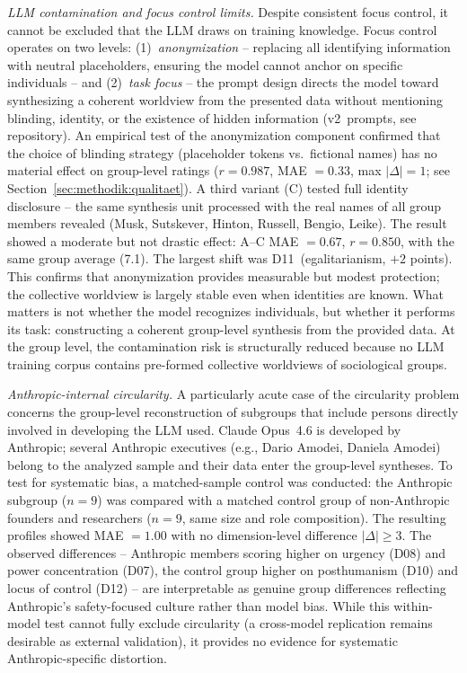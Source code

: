 \documentclass[12pt,a4paper]{article}
\begin{document}
\emph{LLM contamination and focus control limits.} Despite consistent focus control, it cannot be excluded that the LLM draws on training knowledge. Focus control operates on two levels: (1)~\emph{anonymization} -- replacing all identifying information with neutral placeholders, ensuring the model cannot anchor on specific individuals -- and (2)~\emph{task focus} -- the prompt design directs the model toward synthesizing a coherent worldview from the presented data without mentioning blinding, identity, or the existence of hidden information (v2~prompts, see repository). An empirical test of the anonymization component confirmed that the choice of blinding strategy (placeholder tokens vs.\ fictional names) has no material effect on group-level ratings ($r = 0.987$, MAE $= 0.33$, max $|\Delta| = 1$; see Section~\ref{sec:methodik:qualitaet}). A third variant (C) tested full identity disclosure -- the same synthesis unit processed with the real names of all group members revealed (Musk, Sutskever, Hinton, Russell, Bengio, Leike). The result showed a moderate but not drastic effect: A--C MAE $= 0.67$, $r = 0.850$, with the same group average (7.1). The largest shift was D11~(egalitarianism, $+2$ points). This confirms that anonymization provides measurable but modest protection; the collective worldview is largely stable even when identities are known. What matters is not whether the model recognizes individuals, but whether it performs its task: constructing a coherent group-level synthesis from the provided data. At the group level, the contamination risk is structurally reduced because no LLM training corpus contains pre-formed collective worldviews of sociological groups.

\emph{Anthropic-internal circularity.} A particularly acute case of the circularity problem concerns the group-level reconstruction of subgroups that include persons directly involved in developing the LLM used. Claude Opus~4.6 is developed by Anthropic; several Anthropic executives (e.g., Dario Amodei, Daniela Amodei) belong to the analyzed sample and their data enter the group-level syntheses. To test for systematic bias, a matched-sample control was conducted: the Anthropic subgroup ($n = 9$) was compared with a matched control group of non-Anthropic founders and researchers ($n = 9$, same size and role composition). The resulting profiles showed MAE $= 1.00$ with no dimension-level difference $|\Delta| \geq 3$. The observed differences -- Anthropic members scoring higher on urgency (D08) and power concentration (D07), the control group higher on posthumanism (D10) and locus of control (D12) -- are interpretable as genuine group differences reflecting Anthropic's safety-focused culture rather than model bias. While this within-model test cannot fully exclude circularity (a cross-model replication remains desirable as external validation), it provides no evidence for systematic Anthropic-specific distortion.
\end{document}
